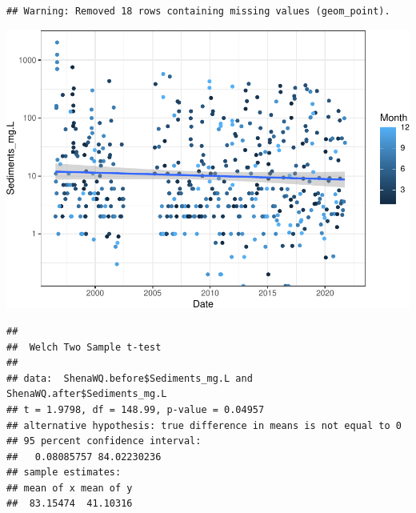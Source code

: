 \documentclass[
  12pt,
]{article}
\newenvironment{Shaded}{\begin{snugshade}}{\end{snugshade}}
\newcommand{\AttributeTok}[1]{\textcolor[rgb]{0.77,0.63,0.00}{#1}}
\newcommand{\CommentTok}[1]{\textcolor[rgb]{0.56,0.35,0.01}{\textit{#1}}}
\newcommand{\ConstantTok}[1]{\textcolor[rgb]{0.00,0.00,0.00}{#1}}
\newcommand{\FunctionTok}[1]{\textcolor[rgb]{0.00,0.00,0.00}{#1}}
\newcommand{\NormalTok}[1]{#1}
\newcommand{\OtherTok}[1]{\textcolor[rgb]{0.56,0.35,0.01}{#1}}
\newcommand{\SpecialCharTok}[1]{\textcolor[rgb]{0.00,0.00,0.00}{#1}}
\newcommand{\StringTok}[1]{\textcolor[rgb]{0.31,0.60,0.02}{#1}}
\begin{document}
\begin{verbatim}
## Warning: Removed 18 rows containing missing values (geom_point).
\end{verbatim}

\includegraphics{Project_Template_files/figure-latex/Sediment_Analysis-1.pdf}

\begin{Shaded}
\end{Shaded}

\begin{verbatim}
## 
##  Welch Two Sample t-test
## 
## data:  ShenaWQ.before$Sediments_mg.L and ShenaWQ.after$Sediments_mg.L
## t = 1.9798, df = 148.99, p-value = 0.04957
## alternative hypothesis: true difference in means is not equal to 0
## 95 percent confidence interval:
##   0.08085757 84.02230236
## sample estimates:
## mean of x mean of y 
##  83.15474  41.10316
\end{verbatim}
\end{document}
